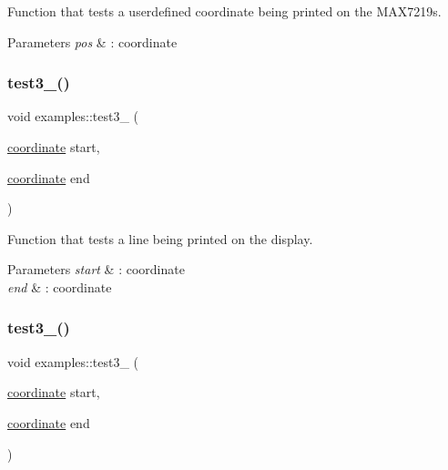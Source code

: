 Function that tests a userdefined coordinate being printed on the M\+A\+X7219s. 


\begin{DoxyParams}{Parameters}
{\em pos} & \+: coordinate \\
\hline
\end{DoxyParams}
\mbox{\label{classexamples_a13dcac0e0ff1501fbe91cb6cd94e9569}} 
\subsubsection{\texorpdfstring{test3\+\_()}{test3\_1()}}
{\footnotesize\ttfamily void examples\+::test3\+\_ (\begin{DoxyParamCaption}\item[{\hyperlink{classcoordinate}{coordinate}}]{start,  }\item[{\hyperlink{classcoordinate}{coordinate}}]{end }\end{DoxyParamCaption})\hspace{0.3cm}{\ttfamily [inline]}}



Function that tests a line being printed on the display. 


\begin{DoxyParams}{Parameters}
{\em start} & \+: coordinate \\
\hline
{\em end} & \+: coordinate \\
\hline
\end{DoxyParams}
\mbox{\label{classexamples_ae49a88c23216177d92ef54295d4de334}} 
\subsubsection{\texorpdfstring{test3\+\_()}{test3\_2()}}
{\footnotesize\ttfamily void examples\+::test3\+\_ (\begin{DoxyParamCaption}\item[{\hyperlink{classcoordinate}{coordinate}}]{start,  }\item[{\hyperlink{classcoordinate}{coordinate}}]{end }\end{DoxyParamCaption})\hspace{0.3cm}{\ttfamily [inline]}}



